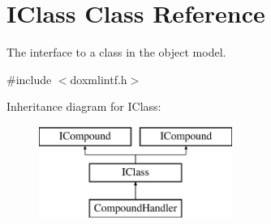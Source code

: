 \hypertarget{class_i_class}{}\section{I\+Class Class Reference}
\label{class_i_class}


The interface to a class in the object model.  




{\ttfamily \#include $<$doxmlintf.\+h$>$}

Inheritance diagram for I\+Class\+:\begin{figure}[H]
\begin{center}
\leavevmode
\includegraphics[height=3.000000cm]{class_i_class}
\end{center}
\end{figure}
